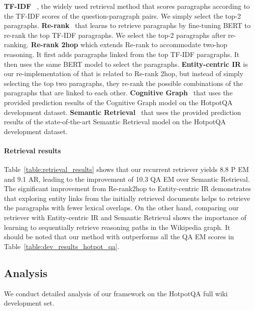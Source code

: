 \documentclass{article} \usepackage{iclr2020_conference,times}
\begin{document}
{\bf TF-IDF} ~\citep{chen2017reading}, the widely used retrieval method that scores paragraphs according to the TF-IDF scores of the question-paragraph pairs.
We simply select the top-2 paragraphs.
\newline
{\bf Re-rank}~\citep{nogueira2019passage} that learns to retrieve paragraphs by fine-tuning BERT to re-rank the top  TF-IDF paragraphs.
We select the top-2 paragraphs after re-ranking.
\newline
{\bf  Re-rank 2hop} which extends Re-rank to accommodate two-hop reasoning.
It first adds paragraphs linked from the top TF-IDF paragraphs.
It then uses the same BERT model to select the paragraphs.
\newline
{\bf Entity-centric IR} is our re-implementation of \cite{godbole2019entity_links} that is related to Re-rank 2hop, but instead of simply selecting the top two paragraphs, they re-rank the possible combinations of the paragraphs that are linked to each other.
\newline
{\bf Cognitive Graph}~\citep{cognitive_graph_2019} that uses the provided prediction results of the Cognitive Graph model on the HotpotQA development dataset.\newline
{\bf Semantic Retrieval}~\citep{nie_pip_2019} that uses the provided prediction results of the state-of-the-art Semantic Retrieval model on the HotpotQA development dataset.

\vspace{-2mm} \paragraph{Retrieval results}
Table~\ref{table:retrieval_results} shows that our recurrent retriever yields 8.8 P EM and 9.1 AR, leading to the improvement of 10.3 QA EM over Semantic Retrieval.
The significant improvement from Re-rank2hop to Entity-centric IR demonstrates that exploring entity links from the initially retrieved documents helps to retrieve the paragraphs with fewer lexical overlaps.
On the other hand, comparing our retriever with Entity-centric IR and Semantic Retrieval shows the importance of learning to sequentially retrieve reasoning paths in the Wikipedia graph. 
It should be noted that our method with  outperforms all the QA EM scores in Table~\ref{table:dev_results_hotpot_qa}.

\subsection{Analysis}
We conduct detailed analysis of our framework on the HotpotQA full wiki development set.
\label{sec:analysis}
\end{document}
